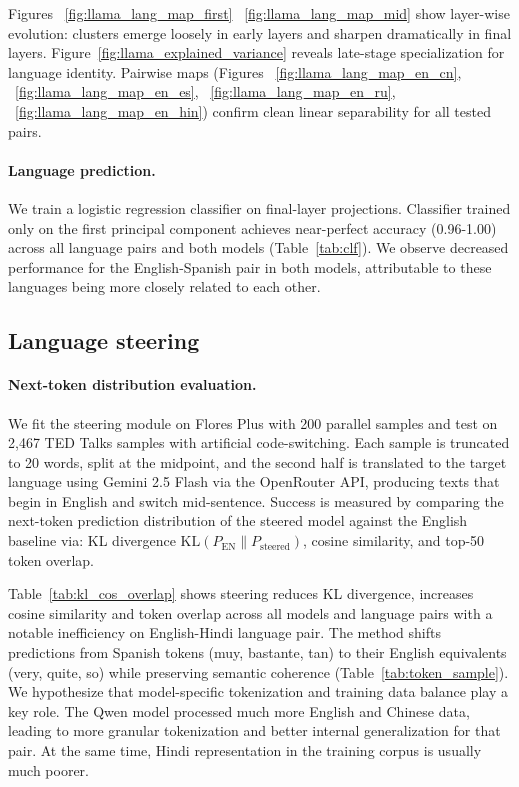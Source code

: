 Figures ~\ref{fig:llama_lang_map_first} ~\ref{fig:llama_lang_map_mid} show layer-wise evolution:
clusters emerge loosely in early layers and sharpen dramatically in final layers.
Figure~\ref{fig:llama_explained_variance} reveals late-stage specialization for language identity.
Pairwise maps (Figures ~\ref{fig:llama_lang_map_en_cn}, ~\ref{fig:llama_lang_map_en_es}, ~\ref{fig:llama_lang_map_en_ru}, ~\ref{fig:llama_lang_map_en_hin}) confirm clean linear separability for all tested pairs.

\paragraph{Language prediction.} We train a logistic regression classifier on final-layer projections. Classifier trained only on the first principal component achieves near-perfect accuracy (0.96-1.00) across all language pairs and both models (Table~\ref{tab:clf}).
We observe decreased performance for the English-Spanish pair in both models, attributable to these languages being more closely related to each other.
\subsection{Language steering}

\paragraph{Next-token distribution evaluation.} We fit the steering module on Flores Plus with 200 parallel samples and test on 2,467 TED Talks \citep{banik2017tedtalks} samples with artificial code-switching.
Each sample is truncated to 20 words, split at the midpoint, and the second half is translated to the target language using Gemini 2.5 Flash via the OpenRouter API, producing texts that begin in English and switch mid-sentence.
Success is measured by comparing the next-token prediction distribution of the steered model against the English baseline via: KL divergence $\text{KL}(P_{\text{EN}} \| P_{\text{steered}})$, cosine similarity, and top-50 token overlap.

Table~\ref{tab:kl_cos_overlap} shows steering reduces KL divergence, increases cosine similarity and token overlap across all models and language pairs with a notable inefficiency on English-Hindi language pair.
The method shifts predictions from Spanish tokens (muy, bastante, tan) to their English equivalents (very, quite, so) while preserving semantic coherence (Table~\ref{tab:token_sample}).
We hypothesize that model-specific tokenization and training data balance play a key role. The Qwen model processed much more English and Chinese data, leading to more granular tokenization and better internal generalization for that pair.
At the same time, Hindi representation in the training corpus is usually much poorer.

